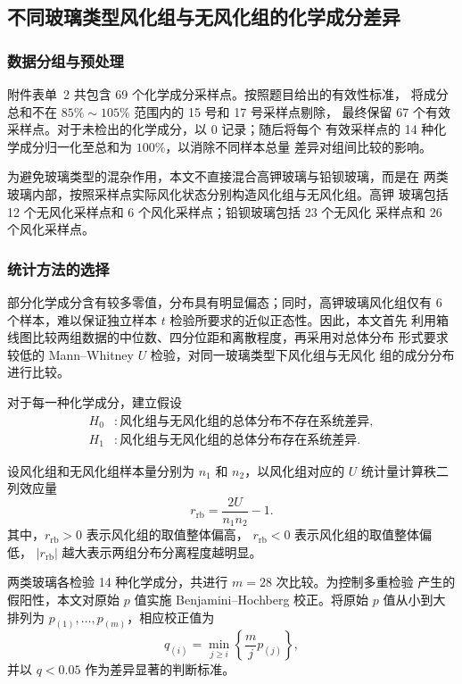 \subsection{不同玻璃类型风化组与无风化组的化学成分差异}

\subsubsection{数据分组与预处理}

附件表单~2 共包含 69 个化学成分采样点。按照题目给出的有效性标准，
将成分总和不在 $85\%\sim105\%$ 范围内的 15 号和 17 号采样点剔除，
最终保留 67 个有效采样点。对于未检出的化学成分，以 0 记录；随后将每个
有效采样点的 14 种化学成分归一化至总和为 $100\%$，以消除不同样本总量
差异对组间比较的影响。

为避免玻璃类型的混杂作用，本文不直接混合高钾玻璃与铅钡玻璃，而是在
两类玻璃内部，按照采样点实际风化状态分别构造风化组与无风化组。高钾
玻璃包括 12 个无风化采样点和 6 个风化采样点；铅钡玻璃包括 23 个无风化
采样点和 26 个风化采样点。

\subsubsection{统计方法的选择}

部分化学成分含有较多零值，分布具有明显偏态；同时，高钾玻璃风化组仅有
6 个样本，难以保证独立样本 $t$ 检验所要求的近似正态性。因此，本文首先
利用箱线图比较两组数据的中位数、四分位距和离散程度，再采用对总体分布
形式要求较低的 Mann--Whitney $U$ 检验，对同一玻璃类型下风化组与无风化
组的成分分布进行比较。

对于每一种化学成分，建立假设
\begin{equation}
    \begin{aligned}
        H_0 &: \text{风化组与无风化组的总体分布不存在系统差异},\\
        H_1 &: \text{风化组与无风化组的总体分布存在系统差异}.
    \end{aligned}
\end{equation}

设风化组和无风化组样本量分别为 $n_1$ 和 $n_2$，以风化组对应的
$U$ 统计量计算秩二列效应量
\begin{equation}
    r_{\mathrm{rb}}=\frac{2U}{n_1n_2}-1.
\end{equation}
其中，$r_{\mathrm{rb}}>0$ 表示风化组的取值整体偏高，
$r_{\mathrm{rb}}<0$ 表示风化组的取值整体偏低，
$|r_{\mathrm{rb}}|$ 越大表示两组分布分离程度越明显。

两类玻璃各检验 14 种化学成分，共进行 $m=28$ 次比较。为控制多重检验
产生的假阳性，本文对原始 $p$ 值实施 Benjamini--Hochberg 校正。将原始
$p$ 值从小到大排列为 $p_{(1)},\ldots,p_{(m)}$，相应校正值为
\begin{equation}
    q_{(i)}=\min_{j\geq i}\left\{\frac{m}{j}p_{(j)}\right\},
\end{equation}
并以 $q<0.05$ 作为差异显著的判断标准。

